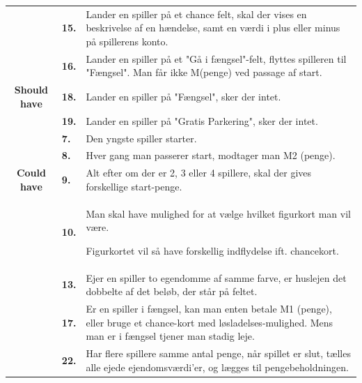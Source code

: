 \begin{center}
\begin{tabular}{ || c | l | p{11.5cm} ||}
     \cline{2-3}
     &
     \textbf{15.}
     &
     Lander en spiller på et chance felt, skal der vises en beskrivelse af en hændelse, samt en værdi i plus eller minus på spillerens konto.
     \\

     \cline{2-3}
     &
     \textbf{16.}
     &
     Lander en spiller på et "Gå i fængsel"-felt, flyttes spilleren til "Fængsel". Man får ikke M(penge) ved passage af start.
     \\
    
     \cline{2-3}
     \textbf{Should have}
     &
     \textbf{18.}
     &
     Lander en spiller på "Fængsel", sker der intet. \\
    
     \cline{2-3}
     &
     \textbf{19.}
     &
     Lander en spiller på "Gratis Parkering", sker der intet. \\
     \hline
     \hline
     &
     \textbf{7.}
     &
     Den yngste spiller starter.
     \\

     \cline{2-3}
     &
     \textbf{8.}
     &
     Hver gang man passerer start, modtager man M2 (penge).
     \\
     
     \cline{2-3}
     \textbf{Could have}
     &
     \textbf{9.}
     &
     Alt efter om der er 2, 3 eller 4 spillere, skal der gives forskellige start-penge.
     \\

     \cline{2-3}
     &
     \textbf{10.}
     &
     Man skal have mulighed for at vælge hvilket figurkort man vil være.
     
     Figurkortet vil så have forskellig indflydelse ift. chancekort. \\

     \cline{2-3}
     &
     \textbf{13.}
     &
     Ejer en spiller to egendomme af samme farve, er huslejen det dobbelte af det beløb, der står på feltet. \\

     \cline{2-3}
     &
     \textbf{17.}
     &
     Er en spiller i fængsel, kan man enten betale M1 (penge), eller bruge et chance-kort med løsladelses-mulighed. Mens man er i fængsel tjener man stadig leje. \\

    \hline
    \hline
    &
    \textbf{22.}
    &
    Har flere spillere samme antal penge, når spillet er slut, tælles alle ejede ejendomsværdi'er, og lægges til pengebeholdningen. \\


\end{tabular}
\end{center}
